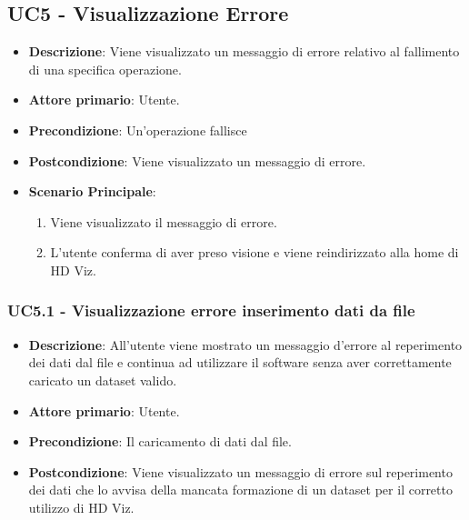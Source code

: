\newpage
\subsection{UC5 - Visualizzazione Errore}
\label{sub:uc5}

\begin{itemize}
    \item \textbf{Descrizione}: Viene visualizzato un messaggio di errore relativo al fallimento di una specifica operazione.

    \item \textbf{Attore primario}: Utente.
    
    \item \textbf{Precondizione}:   Un'operazione fallisce

    \item \textbf{Postcondizione}:  Viene visualizzato un messaggio di errore.
    
    \item \textbf{Scenario Principale}:
    \begin{enumerate}
        \item Viene visualizzato il messaggio di errore.
        \item L'utente conferma di aver preso visione e viene reindirizzato alla home di HD Viz.
    \end{enumerate}

\end{itemize}


\subsubsection{UC5.1 - Visualizzazione errore inserimento dati da file}
\label{ssub:uc5.1}
\begin{itemize}
    \item \textbf{Descrizione}: All'utente viene mostrato un messaggio d'errore al reperimento
                                dei dati dal file e continua ad utilizzare 
                                il software senza aver correttamente caricato un dataset valido.

    \item \textbf{Attore primario}: Utente.
    
    \item \textbf{Precondizione}:   Il caricamento di dati dal file.

    \item \textbf{Postcondizione}:  Viene visualizzato un messaggio di errore sul reperimento dei 
                                    dati che lo avvisa della mancata formazione di un dataset per il
                                    corretto utilizzo di HD Viz.

\end{itemize}


